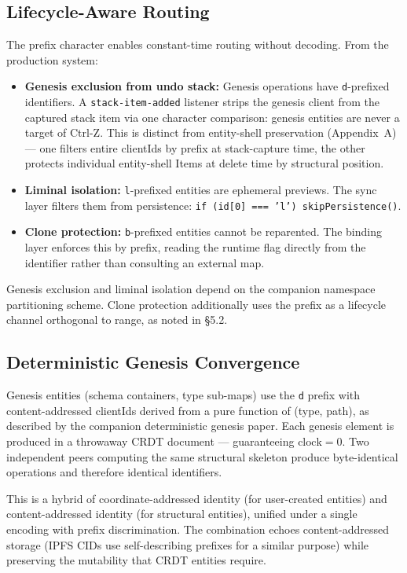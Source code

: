 \subsection{Lifecycle-Aware Routing}

The prefix character enables constant-time routing without decoding. From the production system:

\begin{itemize}
    \item \textbf{Genesis exclusion from undo stack:} Genesis operations have \texttt{d}-prefixed identifiers. A \texttt{stack-item-added} listener strips the genesis client from the captured stack item via one character comparison: genesis entities are never a target of Ctrl-Z. This is distinct from entity-shell preservation (Appendix~A) --- one filters entire clientIds by prefix at stack-capture time, the other protects individual entity-shell Items at delete time by structural position.
    \item \textbf{Liminal isolation:} \texttt{l}-prefixed entities are ephemeral previews. The sync layer filters them from persistence: \texttt{if (id[0] === 'l') skipPersistence()}.
    \item \textbf{Clone protection:} \texttt{b}-prefixed entities cannot be reparented. The binding layer enforces this by prefix, reading the runtime flag directly from the identifier rather than consulting an external map.
\end{itemize}

Genesis exclusion and liminal isolation depend on the companion namespace partitioning scheme\cite{plexus:partitioning}. Clone protection additionally uses the prefix as a lifecycle channel orthogonal to range, as noted in \S5.2.

\subsection{Deterministic Genesis Convergence}

Genesis entities (schema containers, type sub-maps) use the \texttt{d} prefix with content-addressed clientIds derived from a pure function of (type, path), as described by the companion deterministic genesis paper\cite{plexus:genesis}. Each genesis element is produced in a throwaway CRDT document --- guaranteeing $\mathrm{clock} = 0$. Two independent peers computing the same structural skeleton produce byte-identical operations and therefore identical identifiers.

This is a hybrid of coordinate-addressed identity (for user-created entities) and content-addressed identity (for structural entities), unified under a single encoding with prefix discrimination. The combination echoes content-addressed storage (IPFS CIDs use self-describing prefixes for a similar purpose) while preserving the mutability that CRDT entities require.

